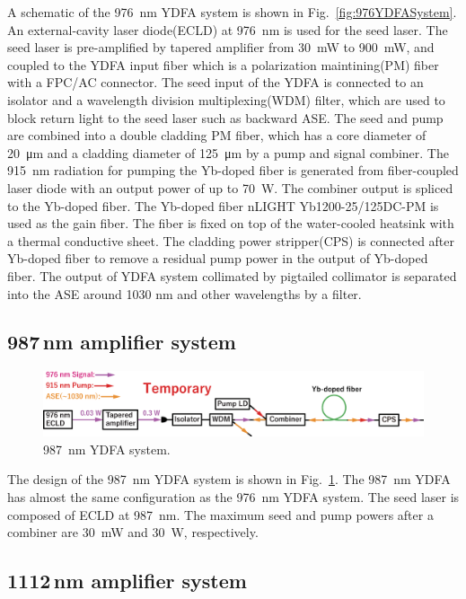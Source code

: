 \documentclass{osa-article}
\begin{document}
A schematic of the \SI{976}{\nm} YDFA system is shown in Fig.~\ref{fig:976YDFASystem}.
An external-cavity laser diode(ECLD) at \SI{976}{\nm} is used for the seed laser.
The seed laser is pre-amplified by tapered amplifier from \SI{30}{\mW} to \SI{900}{\mW}, and coupled to the YDFA input fiber which is a polarization maintining(PM) fiber with a FPC/AC connector.
The seed input of the YDFA is connected to an isolator and a wavelength division multiplexing(WDM) filter, which are used to block return light to the seed laser such as backward ASE.
The seed and pump are combined into a double cladding PM fiber, which has a core diameter of \SI{20}{\um} and a cladding diameter of \SI{125}{\um} by a pump and signal combiner.
The \SI{915}{\nm} radiation for pumping the Yb-doped fiber is generated from fiber-coupled laser diode with an output power of up to \SI{70}{\W}.
The combiner output is spliced to the Yb-doped fiber.
The Yb-doped fiber nLIGHT Yb1200-25/125DC-PM is used as the gain fiber.
The fiber is fixed on top of the water-cooled heatsink with a thermal conductive sheet.
The cladding power stripper(CPS) is connected after Yb-doped fiber to remove a residual pump power in the output of Yb-doped fiber.
The output of YDFA system collimated by pigtailed collimator is separated into the ASE around 1030 nm and other wavelengths by a filter.


\subsection{987\,nm amplifier system}

\begin{figure}[h!]
  \centering\includegraphics[width=\linewidth]{./Figure/976nmYDFASystem.eps}
  \caption{\SI{987}{\nm} YDFA system.}
  \label{fig:987YDFASystem}
\end{figure}

The design of the \SI{987}{\nm} YDFA system is shown in Fig.~\ref{fig:987YDFASystem}.
The \SI{987}{\nm} YDFA has almost the same configuration as the \SI{976}{\nm} YDFA system.
The seed laser is composed of ECLD at \SI{987}{\nm}.
The maximum seed and pump powers after a combiner are \SI{30}{\mW} and \SI{30}{\W}, respectively.


\subsection{1112\,nm amplifier system}
\end{document}
